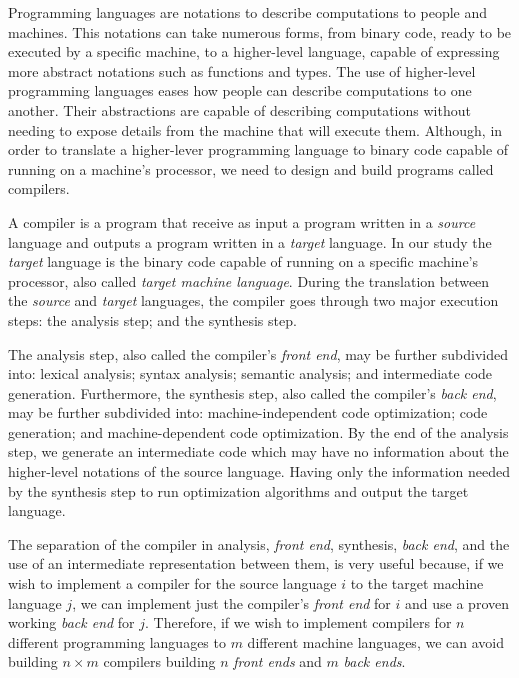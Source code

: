 \documentclass[
  english,
  lmodern,
  oneside
]{ufsc-thesis-rn46-2019/ufsc-thesis-rn46-2019}
\begin{document}
Programming languages are notations to describe computations to people and machines.
This notations can take numerous forms, from binary code, ready to be executed by a specific machine, to a higher-level language, capable of expressing more abstract notations such as functions and types.
The use of higher-level programming languages eases how people can describe computations to one another.
Their abstractions are capable of describing computations without needing to expose details from the machine that will execute them.
Although, in order to translate a higher-lever programming language to binary code capable of running on a machine's processor, we need to design and build programs called compilers.

A compiler is a program that receive as input a program written in a \textit{source} language and outputs a program written in a \textit{target} language.
In our study the \textit{target} language is the binary code capable of running on a specific machine's processor, also called \textit{target machine language}.
During the translation between the \textit{source} and \textit{target} languages, the compiler goes through two major execution steps: the analysis step; and the synthesis step.

The analysis step, also called the compiler's \textit{front end}, may be further subdivided into: lexical analysis; syntax analysis; semantic analysis; and intermediate code generation.
Furthermore, the synthesis step, also called the compiler's \textit{back end}, may be further subdivided into: machine-independent code optimization; code generation; and machine-dependent code optimization.
By the end of the analysis step, we generate an intermediate code which may have no information about the higher-level notations of the source language.
Having only the information needed by the synthesis step to run optimization algorithms and output the target language.

The separation of the compiler in analysis, \textit{front end}, synthesis, \textit{back end}, and the use of an intermediate representation between them, is very useful because, if we wish to implement a compiler for the source language $i$ to the target machine language $j$, we can implement just the compiler's \textit{front end} for $i$ and use a proven working \textit{back end} for $j$.
Therefore, if we wish to implement compilers for $n$ different programming languages to $m$ different machine languages, we can avoid building $n \times m$ compilers building $n$ \textit{front ends} and $m$ \textit{back ends}.
\end{document}
